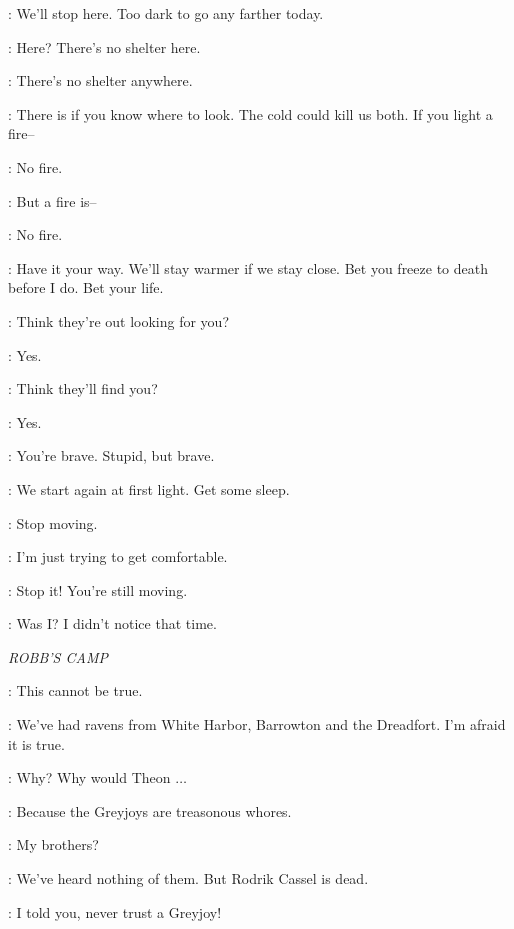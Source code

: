 \JON: We'll stop here. Too dark to go any farther today. 

\YGRITTE: Here? There's no shelter here. 

\JON: There's no shelter anywhere. 

\YGRITTE: There is if you know where to look.  The cold could kill us both. If you light a fire-- 

\JON: No fire. 

\YGRITTE: But a fire is-- 

\JON: No fire. 

\YGRITTE: Have it your way.  We'll stay warmer if we stay close. Bet you freeze to death before I do. Bet your life.


\YGRITTE: Think they're out looking for you? 

\JON: Yes. 

\YGRITTE: Think they'll find you? 

\JON: Yes. 

\YGRITTE: You're brave. Stupid, but brave. 

\JON: We start again at first light. Get some sleep.


\JON: Stop moving. 

\YGRITTE: I'm just trying to get comfortable. 

\JON: Stop it! You're still moving. 

\YGRITTE: Was I? I didn't notice that time. 


\scene

\textit{ROBB'S CAMP} 


\ROBB: This cannot be true. 

\ROOSE: We've had ravens from White Harbor, Barrowton and the Dreadfort. I'm afraid it is true. 

\ROBB: Why? Why would Theon $\ldots$ 

\ROOSE: Because the Greyjoys are treasonous whores. 

\ROBB: My brothers? 

\ROOSE: We've heard nothing of them. But Rodrik Cassel is dead. 

\CATELYN: I told you, never trust a Greyjoy! 

